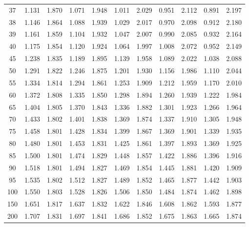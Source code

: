 \documentclass[12pt]{article}
\begin{document}
\begin{table}
\begin{center}
{\begin{tabular}{|c|c|c|c|c|c|c|c|c|c|c|}
37&1.131&
1.870&1.071&1.948&1.011&2.029&0.951&2.112&0.891&2.197\\


38&1.146&1.864&1.088&
1.939&1.029&2.017&0.970&2.098&0.912&2.180\\


39&1.161&1.859&1.104&1.932&1.047&
2.007&0.990&2.085&0.932&2.164\\


40&1.175&1.854&1.120&1.924&1.064&1.997&1.008&
2.072&0.952&2.149\\

45&1.238&1.835&1.189&1.895&1.139&1.958&1.089&2.022&1.038&
2.088\\


50&1.291&1.822&1.246&1.875&1.201&1.930&1.156&1.986&1.110&2.044\\


55&1.334&1.814&
1.294&1.861&1.253&1.909&1.212&1.959&1.170&2.010\\


60&1.372&1.808&1.335&1.850&
1.298&1.894&1.260&1.939&1.222&1.984\\


65&1.404&1.805&1.370&1.843&1.336&1.882&
1.301&1.923&1.266&1.964\\


70&1.433&1.802&1.401&1.838&1.369&1.874&1.337&1.910&
1.305&1.948\\


75&1.458&1.801&1.428&1.834&1.399&1.867&1.369&1.901&1.339&1.935\\


80&1.480& 1.801&1.453&1.831&1.425&
1.861&1.397&1.893&1.369&1.925\\


85&1.500&1.801&1.474&
1.829&1.448&1.857&1.422&1.886&1.396&1.916\\


90&1.518&1.801&1.494&1.827&1.469&
1.854&1.445&1.881&1.420&1.909\\


95&1.535&1.802&1.512&1.827&1.489&1.852&1.465&
1.877&1.442&1.903\\


100&1.550&1.803&1.528&1.826&1.506&1.850&1.484&1.874&
1.462&1.898\\


150&1.651&1.817&1.637&1.832&1.622&1.846&1.608&1.862&1.593&
1.877\\


200&1.707&1.831&1.697&1.841&1.686&1.852&1.675&1.863&1.665&1.874\\
  \hline
\end{tabular}
}
\end{center}
\end{table}
\end{document}
